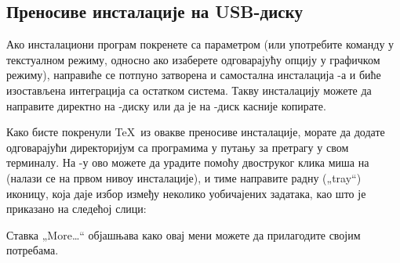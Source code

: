 \documentclass{article}
\begin{document}
\subsection{Преносиве инсталације на USB-диску}
\label{sec:portable-tl}

Ако инсталациони програм покренете са параметром 
(или употребите команду  у текстуалном режиму, односно ако
изаберете одговарајућу опцију у графичком режиму), направиће се
потпуно затворена и самостална инсталација \TL{}-а и биће изостављена
интеграција са остатком система. Такву инсталацију можете да направите
директно на \USB{}-диску или да је на \USB{}-диск касније копирате.

Како бисте покренули \TeX\ из овакве преносиве инсталације, морате да
додате одговарајући директоријум са програмима у путању за претрагу у
свом терминалу. На \Windows{}-у ово можете да урадите помоћу
двоструког клика миша на  (налази се на
првом нивоу инсталације), и тиме направите радну („tray“) иконицу,
која даје избор између неколико уобичајених задатака, као што је
приказано на следећој слици:

\medskip
\begin{center}
\end{center}
\smallskip

\noindent Ставка „More\ldots“ објашњава како овај мени можете да
прилагодите својим потребама.
\end{document}
